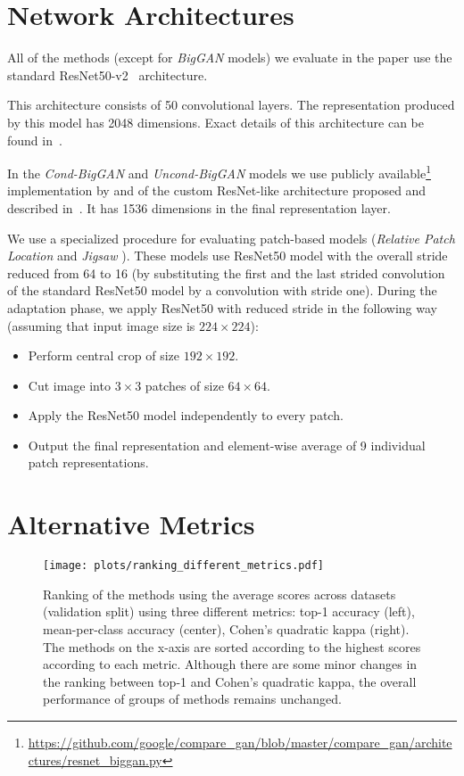 \documentclass{article}
\begin{document}
\clearpage
\section{Network Architectures\label{app:architectures}}

All of the methods (except for \emph{BigGAN} models) we evaluate in the paper use the standard ResNet50-v2~\citep{he2016identity} architecture.

This architecture consists of 50 convolutional layers.
The representation produced by this model has 2048 dimensions.
Exact details of this architecture can be found in~\citep{he2016identity}.

In the \emph{Cond-BigGAN} and \emph{Uncond-BigGAN} models we use publicly available\footnote{\url{https://github.com/google/compare_gan/blob/master/compare_gan/architectures/resnet_biggan.py}} implementation by \cite{lucic2019high} and \citep{chen2019self} of the custom ResNet-like architecture proposed and described in~\citep{brock2018large}. It has 1536 dimensions in the final representation layer.

We use a specialized procedure for evaluating patch-based models (\emph{Relative Patch Location} \citep{doersch2015unsupervised} and \emph{Jigsaw} \citep{noroozi2016unsupervised}). These models use ResNet50 model with the overall stride reduced from 64 to 16 (by substituting the first and the last strided convolution of the standard ResNet50 model by a convolution with stride one). During the adaptation phase, we apply ResNet50 with reduced stride in the following way (assuming that input image size is $224 \times 224$):
\begin{itemize}
\item Perform central crop of size $192 \times 192$.
\item Cut image into $3 \times 3$ patches of size $64 \times 64$.
\item Apply the ResNet50 model independently to every patch.
\item Output the final representation and element-wise average of 9 individual patch representations.
\end{itemize}

\clearpage
\section{Alternative Metrics\label{app:metrics}}

\begin{figure}[h]
    \centering
    \texttt{[image: plots/ranking\_different\_metrics.pdf]}
    \caption{Ranking of the methods using the average scores across datasets (validation split) using three different metrics:
    top-1 accuracy (left),
    mean-per-class accuracy (center),
    Cohen's quadratic kappa (right).
    The methods on the x-axis are sorted according to the highest scores according to each metric.
    Although there are some minor changes in the ranking between top-1 and Cohen's quadratic kappa, 
    the overall performance of groups of methods remains unchanged.}
    \label{fig:metrics}
\end{figure}
\end{document}

